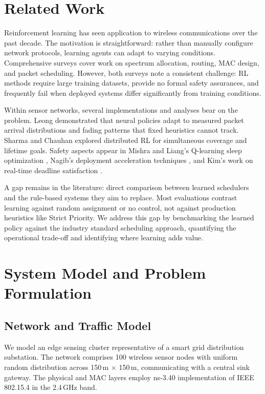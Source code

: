 \documentclass[runningheads,a4paper]{llncs}
\begin{document}
\section{Related Work}
Reinforcement learning has seen application to wireless communications over the past decade. The motivation is straightforward: rather than manually configure network protocols, learning agents can adapt to varying conditions. Comprehensive surveys \cite{luong2019drlsurvey,frikha2021wrlsurvey} cover work on spectrum allocation, routing, MAC design, and packet scheduling. However, both surveys note a consistent challenge: RL methods require large training datasets, provide no formal safety assurances, and frequently fail when deployed systems differ significantly from training conditions.

Within sensor networks, several implementations and analyses bear on the problem. Leong \cite{leong2020automatica} demonstrated that neural policies adapt to measured packet arrival distributions and fading patterns that fixed heuristics cannot track. Sharma and Chauhan \cite{sharma2020wsn} explored distributed RL for simultaneous coverage and lifetime goals. Safety aspects appear in Mishra and Liang's Q-learning sleep optimization \cite{mishra2023sleep}, Nagib's deployment acceleration techniques \cite{nagib2023safe}, and Kim's work on real-time deadline satisfaction \cite{kim2024wtsn}.

A gap remains in the literature: direct comparison between learned schedulers and the rule-based systems they aim to replace. Most evaluations contrast learning against random assignment or no control, not against production heuristics like Strict Priority. We address this gap by benchmarking the learned policy against the industry standard scheduling approach, quantifying the operational trade-off and identifying where learning adds value.

\section{System Model and Problem Formulation}

\subsection{Network and Traffic Model}
We model an edge sensing cluster representative of a smart grid distribution substation. The network comprises 100 wireless sensor nodes with uniform random distribution across 150\,m $\times$ 150\,m, communicating with a central sink gateway. The physical and MAC layers employ ns-3.40 implementation of IEEE 802.15.4 in the 2.4\,GHz band.
\end{document}

